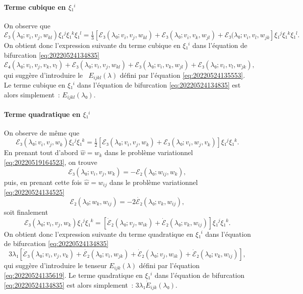 \documentclass[12pt, final]{amsart}
\theoremstyle{definition}
\begin{document}
\paragraph{Terme cubique en \(ξ₁^i\)}On observe que
\begin{equation} ℰ₃(λ₀; v_i, v_j, w_{k l}) ξ₁^j ξ₁^k
  ξ₁^l = \text{} \tfrac{1}{3} [ℰ₃(λ₀; v_i, v_j, w_{k
  l}) +ℰ₃(λ₀; v_i, v_k, w_{j
  l}) +ℰ₃(λ₀; v_i, v_l, w_{j k}] ξ₁^j ξ₁^k
  ξ₁^l . \end{equation}
On obtient donc l'expression suivante du terme cubique en \(ξ₁^i\) dans l'équation de bifurcation \eqref{eq:20220524134835}
\begin{equation} ℰ₄(λ₀; v_i, v_j, v_k, v_l) +ℰ₃(λ₀ ;
  v_i, v_j, w_{k l}) +ℰ₃(λ₀; v_i, v_k, w_{j
  l}) +ℰ₃(λ₀; v_i, v_l, w_{j k}), \end{equation}
qui suggère d'introduire le \ \(E_{i j k l}(λ)\) défini par l'équation \eqref{eq:20220524135553}. Le terme cubique en \(ξ₁^i\) dans l'équation de bifurcation \eqref{eq:20220524134835} est alors simplement~: \(E_{i j k l}(λ₀)\).

\paragraph{Terme quadratique en \(ξ₁^i\)}On observe de même que
\begin{equation} ℰ₃(λ₀; v_i, v_j, w_k) ξ₁^j ξ₁^k = \tfrac{1}{2}
  [ℰ₃(λ₀; v_i, v_j, w_k) +ℰ₃(λ₀; v_i,
  w_j, v_k)] ξ₁^j ξ₁^k . \end{equation}
En prenant tout d'abord \(\widehat{w} = w_k\) dans le problème variationnel \eqref{eq:20220519164523}, on trouve
\begin{equation} ℰ₃(λ₀; v_i, v_j, w_k) = -ℰ₂(λ₀ ;
  w_{i j}, w_k), \end{equation}
puis, en prenant cette fois \(\hat{w} = w_{i j}\) dans le problème variationnel \eqref{eq:20220524134525}
\begin{equation} ℰ₂(λ₀; w_k, w_{i j}) = - 2 \dot{ℰ₂}
 (λ₀; v_k, w_{i j}), \end{equation}
soit finalement
\begin{equation} ℰ₃(λ₀; v_i, v_j, w_k) ξ₁^j ξ₁^k =
  [\dot{ℰ}₂(λ₀; v_j, w_{i k}) +
  \dot{ℰ}₂(λ₀; v_k, w_{i j})] ξ₁^j ξ₁^k .
\end{equation}
On obtient donc l'expression suivante du terme quadratique en \(ξ₁^i\) dans l'équation de bifurcation \eqref{eq:20220524134835}
\begin{equation} 3 λ₁ [\dot{ℰ}₃(λ₀; v_i, v_j, v_k) +
  \dot{ℰ₂}(λ₀; v_i, w_{j k}) +
  \dot{ℰ}₂(λ₀; v_j, w_{i k}) +
  \dot{ℰ}₂(λ₀; v_k, w_{i j})], \end{equation}
qui suggère d'introduire le tenseur \(E_{i j k}(λ)\) défini par l'équation \eqref{eq:20220524135619}. Le terme quadratique en \(ξ₁^i\) dans l'équation de bifurcation \eqref{eq:20220524134835} est alors simplement~: \(3 λ₁ \dot{E}_{i j k}(λ₀)\).
\end{document}
